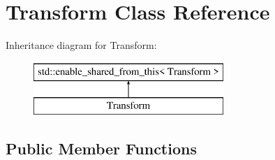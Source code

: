 \hypertarget{class_transform}{}\section{Transform Class Reference}
\label{class_transform}
Inheritance diagram for Transform\+:\begin{figure}[H]
\begin{center}
\leavevmode
\includegraphics[height=2.000000cm]{class_transform}
\end{center}
\end{figure}
\subsection*{Public Member Functions}
